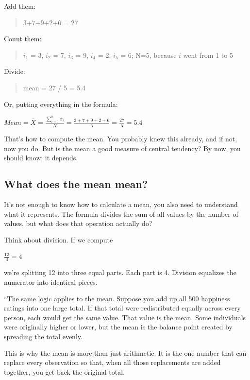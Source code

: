 \documentclass[
  letterpaper,
  DIV=11,
  numbers=noendperiod]{scrreprt}
\begin{document}
Add them:

\begin{quote}
3+7+9+2+6 = 27
\end{quote}

Count them:

\begin{quote}
\(i_{1}\) = 3, \(i_{2}\) = 7, \(i_{3}\) = 9, \(i_{4}\) = 2, \(i_{5}\) =
6; N=5, because \(i\) went from 1 to 5
\end{quote}

Divide:

\begin{quote}
mean = 27 / 5 = 5.4
\end{quote}

Or, putting everything in the formula:

\(Mean = \bar{X} = \frac{\sum_{i=1}^{n} x_{i}}{N} = \frac{3+7+9+2+6}{5} = \frac{27}{5} = 5.4\)

That's how to compute the mean. You probably knew this already, and if
not, now you do. But is the mean a good measure of central tendency? By
now, you should know: it depends.

\subsection{What does the mean mean?}\label{what-does-the-mean-mean}

It's not enough to know how to calculate a mean, you also need to
understand what it represents. The formula divides the sum of all values
by the number of values, but what does that operation actually do?

Think about division. If we compute

\(\frac{12}{3} = 4\)

we're splitting 12 into three equal parts. Each part is 4. Division
equalizes the numerator into identical pieces.

``The same logic applies to the mean. Suppose you add up all 500
happiness ratings into one large total. If that total were redistributed
equally across every person, each would get the same value. That value
is the mean. Some individuals were originally higher or lower, but the
mean is the balance point created by spreading the total evenly.

This is why the mean is more than just arithmetic. It is the one number
that can replace every observation so that, when all those replacements
are added together, you get back the original total.
\end{document}
